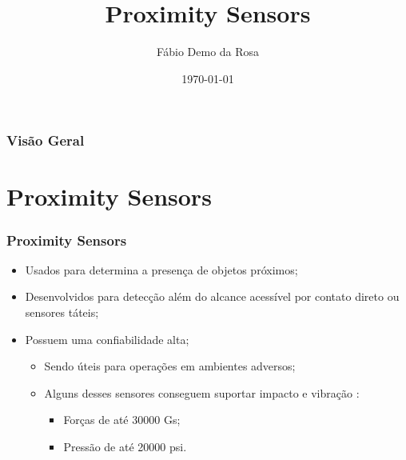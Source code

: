 \documentclass[xcolor=dvipsnames, aspectratio=169]{beamer}
\title[Proximity Sensors]{Proximity Sensors} %
\author[FDR]{Fábio Demo da Rosa} %
\institute[UFSM] %
{
Universidade Federal de Santa Maria \\ %
Pós-Graduação em Ciência da Computação \\
Disciplina de Robótica Móvel\\
\medskip
\textit{faberdemo@gmail.com} %
}
\date{\today} %
\begin{document}
\begin{frame}
\titlepage %
\end{frame}

\begin{frame}
\frametitle{Visão Geral} %
\tableofcontents %
\end{frame}


\section[Proximity Sensors]{Proximity Sensors} 
\begin{frame}
\frametitle{Proximity Sensors}
	\begin{itemize}
		\item Usados para determina a presença de objetos próximos;
		\item Desenvolvidos para detecção além do alcance acessível por contato direto ou sensores táteis;
		\item Possuem uma confiabilidade alta;
		\begin{itemize}
			\item Sendo úteis para operações em ambientes adversos;
			\item Alguns desses sensores conseguem suportar impacto e vibração \cite{everett1995sensors}:
			\begin{itemize}
				\item Forças de até 30000 Gs;
				\item Pressão de até 20000 psi.
			\end{itemize}
		\end{itemize}
	\end{itemize}
\end{frame}
\end{document}
